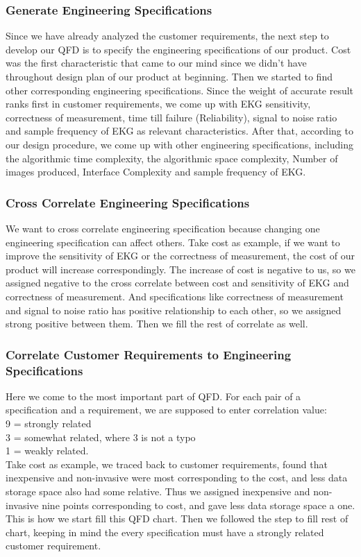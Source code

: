 \documentclass[paper=letter, fontsize=11pt]{scrartcl}
\numberwithin{equation}{section}		%
\numberwithin{figure}{section}			%
\numberwithin{table}{section}			%
\begin{document}
\subsubsection{Generate Engineering Specifications}
Since we have already analyzed the customer requirements, the next step to develop our QFD is to specify the engineering specifications of our product. Cost was the first characteristic that came to our mind since we didn’t have throughout design plan of our product at beginning.  Then we started to find other corresponding engineering specifications. Since the weight of accurate result ranks first in customer requirements, we come up with EKG sensitivity, correctness of measurement, time till failure (Reliability), signal to noise ratio and sample frequency of EKG as relevant characteristics. After that, according to our design procedure, we come up with other engineering specifications, including the algorithmic time complexity, the algorithmic space complexity, Number of images produced, Interface Complexity and sample frequency of EKG.

\subsubsection{Cross Correlate Engineering Specifications}
We want to cross correlate engineering specification because changing one engineering specification can affect others. Take cost as example, if we want to improve the sensitivity of EKG or the correctness of measurement, the cost of our product will increase correspondingly. The increase of cost is negative to us, so we assigned negative to the cross correlate between cost and sensitivity of EKG and correctness of measurement. And specifications like correctness of measurement and signal to noise ratio has positive relationship to each other, so we assigned strong positive between them. Then we fill the rest of correlate as well.

\subsubsection{Correlate Customer Requirements to Engineering Specifications}
Here we come to the most important part of QFD. For each pair of a specification and a requirement, we are supposed to enter correlation value: \\
9 = strongly related \\
3 = somewhat related, where 3 is not a typo \\
1 = weakly related. \\
Take cost as example, we traced back to customer requirements, found that inexpensive and non-invasive were most corresponding to the cost, and less data storage space also had some relative. Thus we assigned inexpensive and non-invasive nine points corresponding to cost, and gave less data storage space a one. This is how we start fill this QFD chart. Then we followed the step to fill rest of chart, keeping in mind the every specification must have a strongly related customer requirement.
\end{document}

